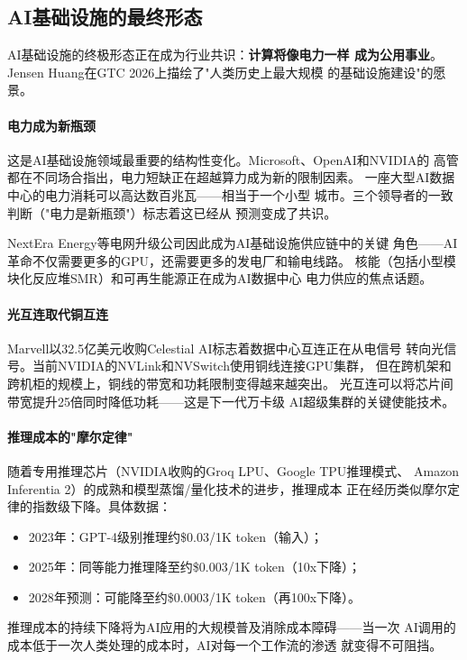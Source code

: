 \subsection{AI基础设施的最终形态}
\label{subsec:outlook-infra-endgame}

AI基础设施的终极形态正在成为行业共识：\textbf{计算将像电力一样
成为公用事业}。Jensen Huang在GTC 2026上描绘了"人类历史上最大规模
的基础设施建设"的愿景。

\paragraph{电力成为新瓶颈}
这是AI基础设施领域最重要的结构性变化。Microsoft、OpenAI和NVIDIA的
高管都在不同场合指出，电力短缺正在超越算力成为新的限制因素。
一座大型AI数据中心的电力消耗可以高达数百兆瓦——相当于一个小型
城市。三个领导者的一致判断（"电力是新瓶颈"）标志着这已经从
预测变成了共识。

NextEra Energy等电网升级公司因此成为AI基础设施供应链中的关键
角色——AI革命不仅需要更多的GPU，还需要更多的发电厂和输电线路。
核能（包括小型模块化反应堆SMR）和可再生能源正在成为AI数据中心
电力供应的焦点话题。

\paragraph{光互连取代铜互连}
Marvell以32.5亿美元收购Celestial AI标志着数据中心互连正在从电信号
转向光信号。当前NVIDIA的NVLink和NVSwitch使用铜线连接GPU集群，
但在跨机架和跨机柜的规模上，铜线的带宽和功耗限制变得越来越突出。
光互连可以将芯片间带宽提升25倍同时降低功耗——这是下一代万卡级
AI超级集群的关键使能技术。

\paragraph{推理成本的"摩尔定律"}
随着专用推理芯片（NVIDIA收购的Groq LPU、Google TPU推理模式、
Amazon Inferentia 2）的成熟和模型蒸馏/量化技术的进步，推理成本
正在经历类似摩尔定律的指数级下降。具体数据：
\begin{itemize}
  \item 2023年：GPT-4级别推理约\$0.03/1K token（输入）；
  \item 2025年：同等能力推理降至约\$0.003/1K token（10x下降）；
  \item 2028年预测：可能降至约\$0.0003/1K token（再100x下降）。
\end{itemize}

推理成本的持续下降将为AI应用的大规模普及消除成本障碍——当一次
AI调用的成本低于一次人类处理的成本时，AI对每一个工作流的渗透
就变得不可阻挡。

